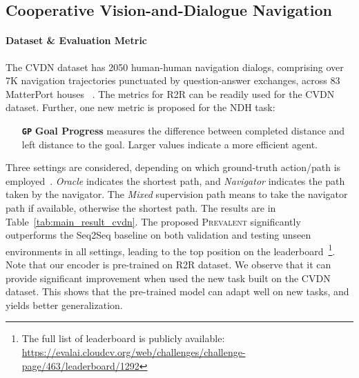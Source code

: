 \documentclass[10pt,twocolumn,letterpaper]{article}
\newcommand{\short}{\textsc{Prevalent}}
\begin{document}
\subsection{Cooperative Vision-and-Dialogue Navigation}
\paragraph{Dataset \& Evaluation Metric} 
The CVDN dataset has 2050 human-human navigation dialogs, comprising over 7K navigation trajectories punctuated by question-answer exchanges, across 83 MatterPort houses~\cite{chang2017matterport3d} .
The metrics for R2R can be readily used for the CVDN dataset. Further, one new metric is proposed for the NDH task: 
\begin{itemize}[noitemsep,topsep=2pt] \item[\textbf{\texttt{GP}}] \textbf{Goal Progress} measures the difference between completed distance and left distance to the goal. Larger values indicate a more efficient agent.
\end{itemize}

Three settings are considered, depending on which ground-truth action/path is employed~\cite{thomason2019vision}. {\it Oracle} indicates the shortest path, and {\it Navigator} indicates the path taken by the navigator. The {\it Mixed} supervision path means to take the navigator path if available, otherwise the shortest path.
The results are in Table~\ref{tab:main_result_cvdn}. The proposed \short{} significantly outperforms the Seq2Seq baseline on both validation and testing unseen environments in all settings, leading to the top position on the leaderboard~\footnote{The full list of leaderboard is publicly available: \url{https://evalai.cloudcv.org/web/challenges/challenge-page/463/leaderboard/1292}}. 
Note that our encoder is pre-trained on R2R dataset. We observe that it can provide significant improvement when used the new task built on the CVDN dataset. This shows that the pre-trained model can adapt well on new tasks, and yields better generalization.
\end{document}
